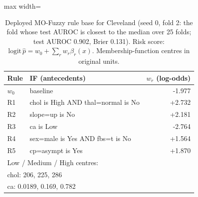 \begin{table}[t]
\centering
\scriptsize
\caption{Deployed MO-Fuzzy rule base for Cleveland (seed 0, fold 2: the fold whose test AUROC is closest to the median over 25 folds; test AUROC 0.902, Brier 0.131). Risk score: $\mathrm{logit}\,\hat p = w_0 + \sum_r w_r \beta_r(x)$. Membership-function centres in original units.}
\label{tab:rules_heart_cleveland}
\begin{adjustbox}{max width=\linewidth}
\begin{tabular}{p{0.6cm}p{5.2cm}r}
\toprule
Rule & IF (antecedents) & $w_r$ (log-odds) \\
\midrule
$w_0$ & baseline & -1.977 \\
R1 & chol is High AND thal=normal is No & +2.732 \\
R2 & slope=up is No & +2.181 \\
R3 & ca is Low & -2.764 \\
R4 & sex=male is Yes AND fbs=t is No & +1.564 \\
R5 & cp=asympt is Yes & +1.870 \\
\midrule
\multicolumn{3}{l}{Low / Medium / High centres:} \\
\multicolumn{3}{l}{\quad chol: 206, 225, 286} \\
\multicolumn{3}{l}{\quad ca: 0.0189, 0.169, 0.782} \\
\bottomrule
\end{tabular}
\end{adjustbox}
\end{table}
